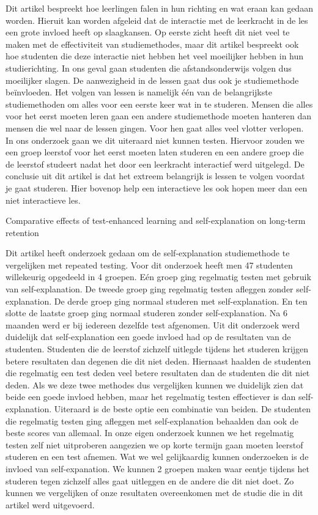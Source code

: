 \documentclass{hogent-article}
\begin{document}
	Dit artikel bespreekt hoe leerlingen falen in hun richting en wat eraan kan gedaan worden. Hieruit kan worden afgeleid dat de interactie met de leerkracht in de les een grote invloed heeft op slaagkansen. Op eerste zicht heeft dit niet veel te maken met de effectiviteit van studiemethodes, maar dit artikel bespreekt ook hoe studenten die deze interactie niet hebben het veel moeilijker hebben in hun studierichting. In ons geval gaan studenten die afstandsonderwijs volgen dus moeilijker slagen. De aanwezigheid in de lessen gaat dus ook je studiemethode beïnvloeden. Het volgen van lessen is namelijk één van de belangrijkste studiemethoden om alles voor een eerste keer wat in te studeren. Mensen die alles voor het eerst moeten leren gaan een andere studiemethode moeten hanteren dan mensen die wel naar de lessen gingen. Voor hen gaat alles veel vlotter verlopen. In ons onderzoek gaan we dit uiteraard niet kunnen testen. Hiervoor zouden we een groep leerstof voor het eerst moeten laten studeren en een andere groep die de leerstof studeert nadat het door een leerkracht interactief werd uitgelegd. De conclusie uit dit artikel is dat het extreem belangrijk is lessen te volgen voordat je gaat studeren. Hier bovenop help een interactieve les ook hopen meer dan een niet interactieve les.
	
	Comparative effects of test-enhanced learning and self-explanation on long-term retention \autocite{LarsenButlerRoediger2013}
	
	Dit artikel heeft onderzoek gedaan om de self-explanation studiemethode te vergelijken met repeated testing. Voor dit onderzoek heeft men 47 studenten willekeurig opgedeeld in 4 groepen. Eén groep ging regelmatig testen met gebruik van self-explanation. De tweede groep ging regelmatig testen afleggen zonder self-explanation. De derde groep ging normaal studeren met self-explanation. En ten slotte de laatste groep ging normaal studeren zonder self-explanation. Na 6 maanden werd er bij iedereen dezelfde test afgenomen. Uit dit onderzoek werd duidelijk dat self-explanation een goede invloed had op de resultaten van de studenten. Studenten die de leerstof zichzelf uitlegde tijdens het studeren krijgen betere resultaten dan degenen die dit niet deden. Hiernaast haalden de studenten die regelmatig een test deden veel betere resultaten dan de studenten die dit niet deden. Als we deze twee methodes dus vergelijken kunnen we duidelijk zien dat beide een goede invloed hebben, maar het regelmatig testen effectiever is dan self-explanation. Uiteraard is de beste optie een combinatie van beiden. De studenten die regelmatig testen ging afleggen met self-explanation behaalden dan ook de beste scores van allemaal. In onze eigen onderzoek kunnen we het regelmatig testen zelf niet uitproberen aangezien we op korte termijn gaan moeten leerstof studeren en een test afnemen. Wat we wel gelijkaardig kunnen onderzoeken is de invloed van self-expanation. We kunnen 2 groepen maken waar eentje tijdens het studeren tegen zichzelf alles gaat uitleggen en de andere die dit niet doet. Zo kunnen we vergelijken of onze resultaten overeenkomen met de studie die in dit artikel werd uitgevoerd.
	
\end{document}
